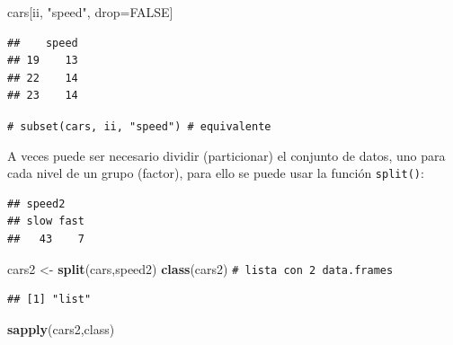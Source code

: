 \documentclass[
]{book}
\newenvironment{Shaded}{\begin{snugshade}}{\end{snugshade}}
\newcommand{\AttributeTok}[1]{\textcolor[rgb]{0.13,0.29,0.53}{#1}}
\newcommand{\CommentTok}[1]{\textcolor[rgb]{0.56,0.35,0.01}{\textit{#1}}}
\newcommand{\ConstantTok}[1]{\textcolor[rgb]{0.56,0.35,0.01}{#1}}
\newcommand{\DecValTok}[1]{\textcolor[rgb]{0.00,0.00,0.81}{#1}}
\newcommand{\FunctionTok}[1]{\textcolor[rgb]{0.13,0.29,0.53}{\textbf{#1}}}
\newcommand{\NormalTok}[1]{#1}
\newcommand{\OtherTok}[1]{\textcolor[rgb]{0.56,0.35,0.01}{#1}}
\newcommand{\SpecialCharTok}[1]{\textcolor[rgb]{0.81,0.36,0.00}{\textbf{#1}}}
\newcommand{\StringTok}[1]{\textcolor[rgb]{0.31,0.60,0.02}{#1}}
\theoremstyle{break}
\theoremstyle{nonumberplain}
\renewcommand{\CommentTok}[1]{\textcolor[rgb]{0.41,0.41,0.41}{\texttt{#1}}}
\begin{document}
\begin{Shaded}
\begin{Highlighting}[]
\NormalTok{cars[ii, }\StringTok{"speed"}\NormalTok{, drop}\OtherTok{=}\ConstantTok{FALSE}\NormalTok{]}
\end{Highlighting}
\end{Shaded}

\begin{verbatim}
##    speed
## 19    13
## 22    14
## 23    14
\end{verbatim}

\begin{Shaded}
\begin{Highlighting}[]
\CommentTok{\# subset(cars, ii, "speed") \# equivalente}
\end{Highlighting}
\end{Shaded}

A veces puede ser necesario dividir (particionar) el conjunto de datos, uno para cada nivel de un grupo (factor), para ello se puede usar la función \texttt{split()}:

\begin{Shaded}
\end{Shaded}

\begin{verbatim}
## speed2
## slow fast 
##   43    7
\end{verbatim}

\begin{Shaded}
\begin{Highlighting}[]
\NormalTok{cars2 }\OtherTok{\textless{}{-}} \FunctionTok{split}\NormalTok{(cars,speed2)}
\FunctionTok{class}\NormalTok{(cars2) }\CommentTok{\# lista con 2 data.frames}
\end{Highlighting}
\end{Shaded}

\begin{verbatim}
## [1] "list"
\end{verbatim}

\begin{Shaded}
\begin{Highlighting}[]
\FunctionTok{sapply}\NormalTok{(cars2,class)}
\end{Highlighting}
\end{Shaded}
\end{document}
